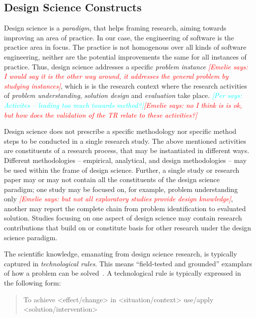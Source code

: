 \documentclass[graybox]{svmult}
\newcommand{\emelie}[1]{\textcolor{red}{{\it [Emelie says: #1]}}}
\newcommand{\per}[1]{\textcolor{cyan}{{\it [Per says: #1]}}}
\newcommand{\emelie}[1]{}
\newcommand{\per}[1]{}
\begin{document}
\subsection{Design Science Constructs}

Design science is a \emph{paradigm}, that helps framing research, aiming towards improving an area of practice. In our case, the engineering of software is the practice area in focus. The practice is not homogenous over all kinds of software engineering, neither are the potential improvements the same for all instances of practice. Thus, design science addresses a specific \emph{problem instance} \emelie{I would say it is the other way around, it addresses the general problem by studying instances}, which is is the research context where the research activities of \emph{problem understanding}, \emph{solution design} and \emph{evaluation} take place. \per{Activites -- leading too much towards method?}\emelie{no I think is is ok, but how does the validation of the TR relate to these activities?}

Design science does not prescribe a specific methodology nor specific method steps to be conducted in a single research study. The above mentioned activities are constituents of  a research process, that may be instantiated in different ways. Different methodologies -- empirical, analytical, and  design methodologies -- may be used within the frame of design science. Further, a single study or research paper may or may not contain all the constituents of the design science paradigm; one study may be focused on, for example,  problem understanding only \emelie{but not all exploratory studies provide design knowledge}, another may report the complete chain from problem identification to evaluated solution. Studies focusing on one aspect of design science may contain research contributions that build on or constitute basis for other research under the design science paradigm.

The scientific knowledge, emanating from design science research, is typically captured in \emph{technological rules}. This means ``field-tested and grounded'' examplars of how a problem can be solved~\cite{van_aken_management_2004}. A technological rule is typically expressed in the following form: 

\begin{quote}{To achieve <effect/change> in <situation/context> use/apply <solution/intervention>}\end{quote}
\end{document}
